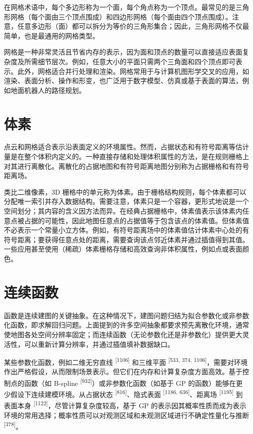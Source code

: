 在网格术语中，每个多边形称为一个面，每个角点称为一个顶点。最常见的是三角形网格（每个面由三个顶点围成）和四边形网格（每个面由四个顶点围成）。注意，任意多边形（面）都可以拆分为等价的三角形集合；因此，三角形网格不仅最简单，也是最通用的网格类型。

网格是一种非常灵活且节省内存的表示，因为面和顶点的数量可以直接适应表面复杂度及所需细节层次。例如，任意大小的平面只需两个三角面和四个顶点即可表示。此外，网格适合并行处理和渲染。网格常用于与计算机图形学交叉的应用，如渲染、表面分析、操作和形变，也广泛用于数字模型、仿真或基于表面的算法，例如地面机器人的路径规划。

\section{体素}

点云和网格适合表示沿表面定义的环境属性。然而，占据状态和有符号距离等估计量是在整个体积内定义的。一种直接存储和处理体积属性的方法，是在规则栅格上对其进行离散化。离散化的占据地图和有符号距离地图分别称为占据栅格和有符号距离场。

类比二维像素，3D 栅格中的单元称为体素。由于栅格结构规则，每个体素都可以分配唯一索引并存入数据结构。需要注意，体素只是一个容器，更形式地说是一个空间划分；其内容的含义因方法而异。在经典占据栅格中，体素值表示该体素内任意点被占据的可能性，因此地图任意点的占据值等于包含该点的体素值。但体素值不必表示一个常量小立方体。例如，有符号距离场中的体素值估计体素中心处的有符号距离；要获得任意点处的距离，需要查询该点邻近体素并通过插值得到其值。一些应用甚至使用（稀疏）体素栅格存储和高效查询非体积属性，例如点或表面颜色。

\section{连续函数}

函数是连续建图的关键抽象。在这种情况下，建图问题归结为拟合参数化或非参数化函数，即求解回归问题。上面提到的许多空间抽象都要求预先离散化环境，通常使地图各处空间分辨率固定；而连续函数（无论参数化还是非参数化）提供更大灵活性，可以重新计算分辨率，并通过插值填补数据缺口。

某些参数化函数，例如二维无穷直线 \textsuperscript{[1106]} 和三维平面 \textsuperscript{[533, 374, 1106]}，需要对环境作出严格假设，从而限制场景表示。但它们在内存和计算复杂度方面高效。基于控制点的函数（如 B-spline \textsuperscript{[932]}）或非参数化函数（如基于 GP 的函数）能够在更少假设下连续建模环境。从占据状态 \textsuperscript{[816]}、隐式表面 \textsuperscript{[1186, 636]}、距离场 \textsuperscript{[1195]} 到表面本身 \textsuperscript{[1122]}，尽管计算复杂度较高，基于 GP 的表示因其概率性质而成为表示环境的常用选择；概率性质可以对观测区域和未观测区域进行不确定性量化与推断 \textsuperscript{[378]}。

